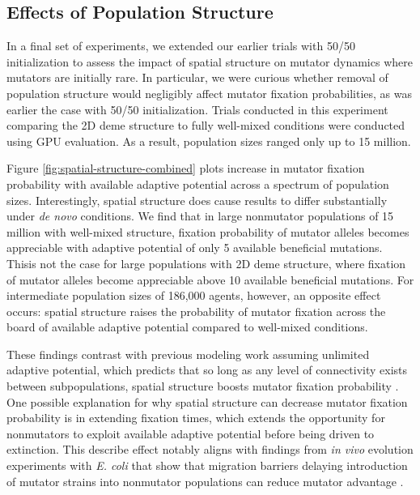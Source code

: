 \subsection{Effects of Population Structure}
\label{sec:population-structure}

In a final set of experiments, we extended our earlier trials with 50/50 initialization to assess the impact of spatial structure on mutator dynamics where mutators are initially rare.
In particular, we were curious whether removal of population structure would negligibly affect mutator fixation probabilities, as was earlier the case with 50/50 initialization.
Trials conducted in this experiment comparing the 2D deme structure to fully well-mixed conditions were conducted using GPU evaluation.
As a result, population sizes ranged only up to 15 million.



Figure \ref{fig:spatial-structure-combined} plots increase in mutator fixation probability with available adaptive potential across a spectrum of population sizes.
Interestingly, spatial structure does cause results to differ substantially under \textit{de novo} conditions.
We find that in large nonmutator populations of 15 million with well-mixed structure, fixation probability of mutator alleles becomes appreciable with adaptive potential of only 5 available beneficial mutations.
Thisis not the case for large populations with 2D deme structure, where fixation of mutator alleles become appreciable above 10 available beneficial mutations.
For intermediate population sizes of 186,000 agents, however, an opposite effect occurs: spatial structure raises the probability of mutator fixation across the board of available adaptive potential compared to well-mixed conditions.

These findings contrast with previous modeling work assuming unlimited adaptive potential, which predicts that so long as any level of connectivity exists between subpopulations, spatial structure boosts mutator fixation probability \citep{raynes2019migration}.
One possible explanation for why spatial structure can decrease mutator fixation probability is in extending fixation times, which extends the opportunity for nonmutators to exploit available adaptive potential before being driven to extinction.
This describe effect notably aligns with findings from \textit{in vivo} evolution experiments with \textit{E. coli} that show that migration barriers delaying introduction of mutator strains into nonmutator populations can reduce mutator advantage \citep{lechat2006escherichia}.

